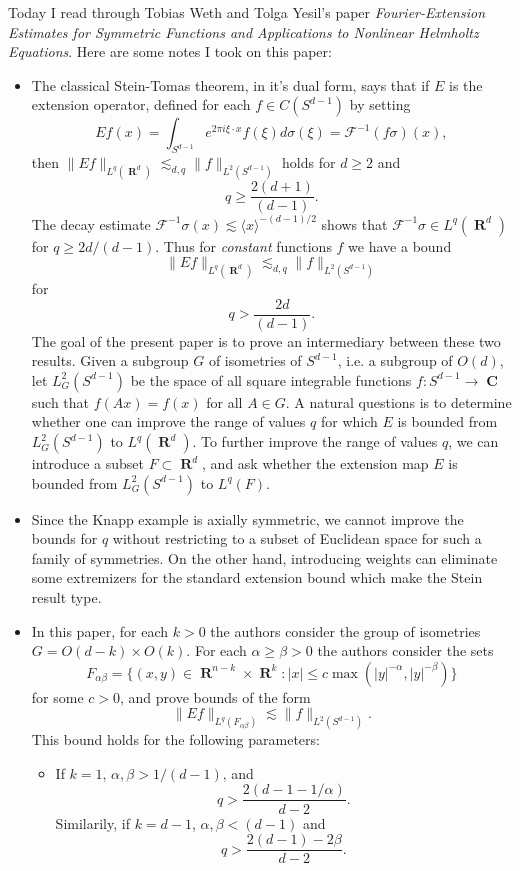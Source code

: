 \documentclass[openany,nobib,nols,a4paper,twoside,symmetric,justified,notoc]{tufte-book}
\theoremstyle{plain}
\theoremstyle{remark}
\theoremstyle{definition}
\DeclareMathOperator{\RR}{\mathbf{R}}
\DeclareMathOperator{\CC}{\mathbf{C}}
\begin{document}
Today I read through Tobias Weth and Tolga Yesil's paper \emph{Fourier-Extension Estimates for Symmetric Functions and Applications to Nonlinear Helmholtz Equations}. Here are some notes I took on this paper:
%
\begin{itemize}
    \item The classical Stein-Tomas theorem, in it's dual form, says that if $E$ is the extension operator, defined for each $f \in C(S^{d-1})$ by setting
    \[ Ef(x) = \int_{S^{d-1}} e^{2 \pi i \xi \cdot x} f(\xi) d\sigma(\xi) = \mathcal{F}^{-1}(f \sigma)(x), \]
    then $\| Ef \|_{L^q(\RR^d)} \lesssim_{d,q} \| f \|_{L^2(S^{d-1})}$ holds for $d \geq 2$ and
    \[ q \geq \frac{2(d+1)}{(d-1)}. \]
    The decay estimate $\mathcal{F}^{-1} \sigma(x) \lesssim \langle x \rangle^{-(d-1)/2}$ shows that $\mathcal{F}^{-1} \sigma \in L^q(\RR^d)$ for $q \geq 2d/(d-1)$. Thus for \emph{constant} functions $f$ we have a bound
    \[ \| Ef \|_{L^q(\RR^d)} \lesssim_{d,q} \| f \|_{L^2(S^{d-1})} \]
    for
    \[ q > \frac{2d}{(d-1)}. \]
    The goal of the present paper is to prove an intermediary between these two results. Given a subgroup $G$ of isometries of $S^{d-1}$, i.e. a subgroup of $O(d)$, let $L^2_G(S^{d-1})$ be the space of all square integrable functions $f: S^{d-1} \to \CC$ such that $f(Ax) = f(x)$ for all $A \in G$. A natural questions is to determine whether one can improve the range of values $q$ for which $E$ is bounded from $L^2_G(S^{d-1})$ to $L^q(\RR^d)$. To further improve the range of values $q$, we can introduce a subset $F \subset \RR^d$, and ask whether the extension map $E$ is bounded from $L^2_G(S^{d-1})$ to $L^q(F)$.

    \item Since the Knapp example is axially symmetric, we cannot improve the bounds for $q$ without restricting to a subset of Euclidean space for such a family of symmetries. On the other hand, introducing weights can eliminate some extremizers for the standard extension bound which make the Stein result type. 

    \item In this paper, for each $k > 0$ the authors consider the group of isometries $G = O(d-k) \times O(k)$. For each $\alpha \geq \beta > 0$ the authors consider the sets
    \[ F_{\alpha \beta} = \{ (x,y) \in \RR^{n-k} \times \RR^k : |x| \leq c \max(|y|^{-\alpha},|y|^{-\beta}) \} \]
    for some $c > 0 $, and prove bounds of the form
    \[ \| Ef \|_{L^q(F_{\alpha \beta})} \lesssim \| f \|_{L^2(S^{d-1})}. \]
    This bound holds for the following parameters:
    \begin{itemize}
        \item If $k = 1$, $\alpha,\beta > 1/(d-1)$, and
        \[ q > \frac{2(d-1-1/\alpha)}{d-2}. \]
        Similarily, if $k = d-1$, $\alpha,\beta < (d-1)$ and
        \[ q > \frac{2(d-1) - 2\beta}{d - 2}. \]


\end{itemize}
\end{itemize}
\end{document}
